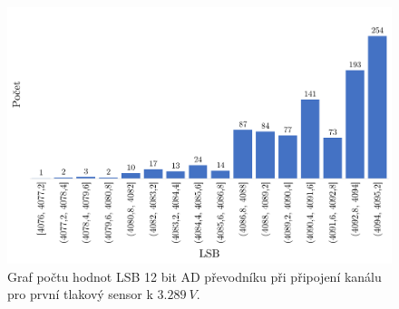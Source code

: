 \begin{figure}[H]
    \caption{Graf počtu hodnot LSB 12 bit AD převodníku při připojení kanálu pro první tlakový sensor k $3.289 \ V$.}
    \label{fig:hist_vacuum1_3_3}
    \includegraphics[width=1\textwidth]{graphs/vacuum1_33.png}

\end{figure}





